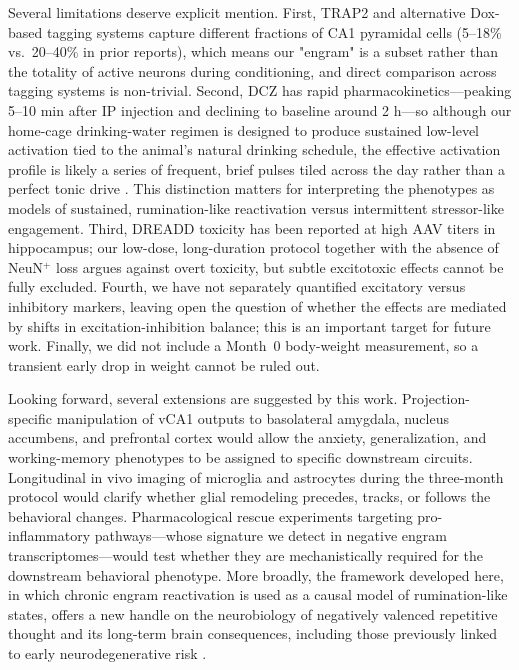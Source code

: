 \documentclass[11pt]{article}
\begin{document}
Several limitations deserve explicit mention. First, TRAP2 and alternative Dox-based tagging systems capture different fractions of CA1 pyramidal cells (5--18\% vs.\ 20--40\% in prior reports), which means our "engram" is a subset rather than the totality of active neurons during conditioning, and direct comparison across tagging systems is non-trivial. Second, DCZ has rapid pharmacokinetics---peaking 5--10 min after IP injection and declining to baseline around 2 h---so although our home-cage drinking-water regimen is designed to produce sustained low-level activation tied to the animal's natural drinking schedule, the effective activation profile is likely a series of frequent, brief pulses tiled across the day rather than a perfect tonic drive \citep{nagai2020dcz}. This distinction matters for interpreting the phenotypes as models of sustained, rumination-like reactivation versus intermittent stressor-like engagement. Third, DREADD toxicity has been reported at high AAV titers in hippocampus; our low-dose, long-duration protocol together with the absence of NeuN$^{+}$ loss argues against overt toxicity, but subtle excitotoxic effects cannot be fully excluded. Fourth, we have not separately quantified excitatory versus inhibitory markers, leaving open the question of whether the effects are mediated by shifts in excitation-inhibition balance; this is an important target for future work. Finally, we did not include a Month~0 body-weight measurement, so a transient early drop in weight cannot be ruled out.

Looking forward, several extensions are suggested by this work. Projection-specific manipulation of vCA1 outputs to basolateral amygdala, nucleus accumbens, and prefrontal cortex \citep{ciocchi2015vca1} would allow the anxiety, generalization, and working-memory phenotypes to be assigned to specific downstream circuits. Longitudinal in vivo imaging of microglia and astrocytes during the three-month protocol would clarify whether glial remodeling precedes, tracks, or follows the behavioral changes. Pharmacological rescue experiments targeting pro-inflammatory pathways---whose signature we detect in negative engram transcriptomes---would test whether they are mechanistically required for the downstream behavioral phenotype. More broadly, the framework developed here, in which chronic engram reactivation is used as a causal model of rumination-like states, offers a new handle on the neurobiology of negatively valenced repetitive thought and its long-term brain consequences, including those previously linked to early neurodegenerative risk \citep{marchant2020rnt}.



\end{document}

